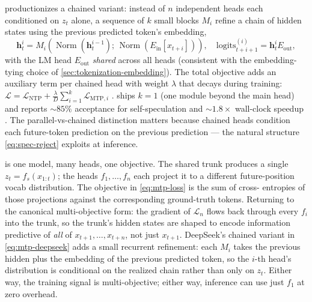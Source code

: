  \citep[\S 2.3.1]{deepseek-v3} productionizes a chained
variant: instead of $n$ independent heads each conditioned on $z_t$
alone, a sequence of $k$ small  blocks $M_i$ refine a
chain of hidden states using the previous predicted token's embedding,
\begin{equation}
\mathbf{h}_t^{i} = M_i\!\left(\operatorname{Norm}(\mathbf{h}_t^{i-1}) ;\, \operatorname{Norm}(E_{\text{in}}[x_{t+i}])\right), \quad
\mathrm{logits}_{t+i+1}^{(i)} = \mathbf{h}_t^{i} E_{\text{out}},
\label{eq:mtp-deepseek}
\end{equation}
with the LM head $E_{\text{out}}$ \emph{shared} across all heads
(consistent with the embedding-tying choice of
\cref{sec:tokenization-embedding}). The total objective adds an
auxiliary term per chained head with weight $\lambda$ that decays
during training:
$\mathcal{L} = \mathcal{L}_{\text{NTP}} + \frac{\lambda}{D} \sum_{i=1}^{k} \mathcal{L}_{\text{MTP},i}$
\citep[\S 2.3.1]{deepseek-v3}.  ships $k = 1$ (one 
module beyond the main head) and reports $\sim 85\%$ acceptance for
self-speculation and $\sim 1.8\times$ wall-clock speedup
\citep[\S 2.3.1]{deepseek-v3}. The parallel-vs-chained distinction
matters because chained heads condition each future-token prediction
on the previous prediction --- the natural  structure
\cref{eq:spec-reject} exploits at inference.

\begin{intuition}
 is one model, many heads, one objective. The shared trunk produces
a single  $z_t = f_s(x_{1:t})$; the heads $f_1, \ldots,
f_n$ each project it to a different future-position vocab
distribution. The objective in \cref{eq:mtp-loss} is the sum of cross-
entropies of those projections against the corresponding ground-truth
tokens. Returning to the canonical multi-objective form: the gradient
of $\mathcal{L}_n$ flows back through every $f_i$ into the trunk, so
the trunk's hidden states are shaped to encode information predictive
of \emph{all} of $x_{t+1}, \ldots, x_{t+n}$, not just $x_{t+1}$.
DeepSeek's chained variant in \cref{eq:mtp-deepseek} adds a small
recurrent refinement: each $M_i$ takes the previous hidden plus the
embedding of the previous predicted token, so the $i$-th head's
distribution is conditional on the realized chain rather than only on
$z_t$. Either way, the training signal is multi-objective; either way,
inference can use just $f_1$ at zero overhead.
\end{intuition}

